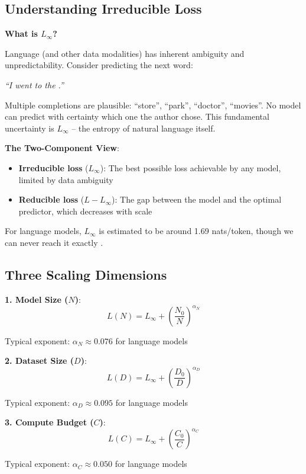 \documentclass{article}
\begin{document}
\subsection{Understanding Irreducible Loss}

\textbf{What is $L_{\infty}$?}

Language (and other data modalities) has inherent ambiguity and unpredictability. Consider predicting the next word:

\begin{center}
\textit{``I went to the \underline{\hspace{2cm}}.''}
\end{center}

Multiple completions are plausible: ``store'', ``park'', ``doctor'', ``movies''. No model can predict with certainty which one the author chose. This fundamental uncertainty is $L_{\infty}$ -- the entropy of natural language itself.

\textbf{The Two-Component View}:
\begin{itemize}
\item \textbf{Irreducible loss} ($L_{\infty}$): The best possible loss achievable by any model, limited by data ambiguity
\item \textbf{Reducible loss} ($L - L_{\infty}$): The gap between the model and the optimal predictor, which decreases with scale
\end{itemize}

For language models, $L_{\infty}$ is estimated to be around 1.69 nats/token, though we can never reach it exactly \cite{kaplan2020scaling}.

\subsection{Three Scaling Dimensions}

\textbf{1. Model Size ($N$)}:
\[
L(N) = L_{\infty} + \left(\frac{N_0}{N}\right)^{\alpha_N}
\]

Typical exponent: $\alpha_N \approx 0.076$ for language models

\textbf{2. Dataset Size ($D$)}:
\[
L(D) = L_{\infty} + \left(\frac{D_0}{D}\right)^{\alpha_D}
\]

Typical exponent: $\alpha_D \approx 0.095$ for language models

\textbf{3. Compute Budget ($C$)}:
\[
L(C) = L_{\infty} + \left(\frac{C_0}{C}\right)^{\alpha_C}
\]

Typical exponent: $\alpha_C \approx 0.050$ for language models
\end{document}
